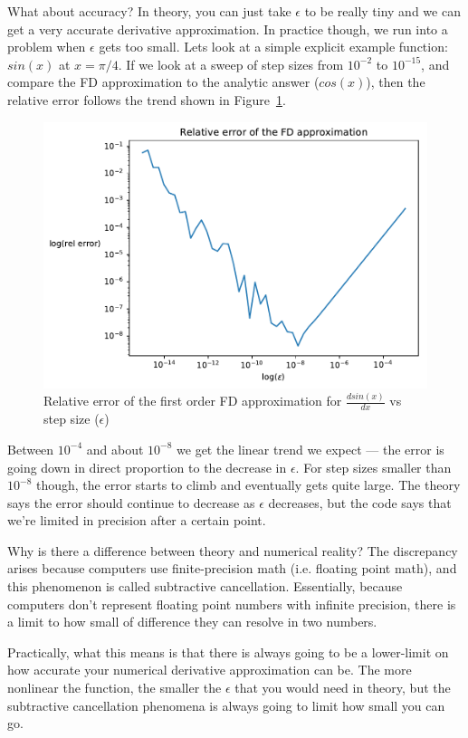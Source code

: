 \documentclass[conf]{new-aiaa}
\begin{document}
    What about accuracy?
    In theory, you can just take $\epsilon$ to be really tiny and we can get a very accurate derivative approximation. 
    In practice though, we run into a problem when $\epsilon$ gets too small.
    Lets look at a simple explicit example function: $sin(x)$ at $x=\pi/4$.
    If we look at a sweep of step sizes from $10^{-2}$ to $10^{-15}$, and compare the FD approximation to the analytic answer ($cos(x)$), 
    then the relative error follows the trend shown in Figure~\ref{fig:fd_subtractive_cancellation}.
    \begin{figure}[H]
        \centering
        
        \includegraphics[width=.75\textwidth]{sin_fd.pdf}
        \caption{Relative error of the first order FD approximation for $\frac{d sin(x)}{dx}$ vs step size ($\epsilon$)}
        \label{fig:fd_subtractive_cancellation}
    \end{figure}
    Between $10^{-4}$ and about $10^{-8}$ we get the linear trend we expect --- the error is going down in direct proportion to the decrease in $\epsilon$. 
    For step sizes smaller than $10^{-8}$ though, the error starts to climb and eventually gets quite large. 
    The theory says the error should continue to decrease as $\epsilon$ decreases, 
    but the code says that we're limited in precision after a certain point. 

    Why is there a difference between theory and numerical reality? 
    The discrepancy arises because computers use finite-precision math (i.e. floating point math), 
    and this phenomenon is called subtractive cancellation. 
    Essentially, because computers don't represent floating point numbers with infinite precision, there is a limit to how small of difference they can resolve in two numbers. 

    Practically, what this means is that there is always going to be a lower-limit on how accurate your numerical derivative approximation can be. 
    The more nonlinear the function, the smaller the $\epsilon$ that you would need in theory, but the subtractive cancellation phenomena is always going to limit how small you can go. 
\end{document}
